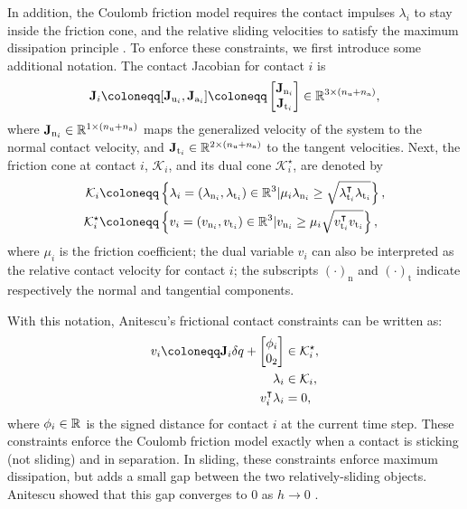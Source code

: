 In addition, the Coulomb friction model requires the contact impulses $\lambda_i$ to stay inside the friction cone, and the relative sliding velocities to satisfy the maximum dissipation principle \cite{stewart2000rigid}. To enforce these constraints, we first introduce some additional notation. The contact Jacobian for contact $i$ is 
\begin{equation}
\label{eq:contact_jacobian_i}
\J_i \coloneqq [\Ju[i], \Ja[i]] \coloneqq 
\begin{bmatrix}
\Jn[i] \\
\Jt[i]
\end{bmatrix}
\in \R[3 \times (\nU + \nA)],
\end{equation}
where $\Jn[i] \in \R[1 \times (\nU + \nA)]$ maps the generalized velocity of the system to the normal contact velocity, and $\Jt[i] \in \R[2 \times (\nU + \nA)]$ to the tangent velocities. Next, the friction cone at contact $i$, $\mathcal{K}_i$, and its dual cone $\mathcal{K}_i^\star$, are denoted by
\begin{subequations}
\label{eq:contact_cones}
\begin{align}
\mathcal{K}_i &\coloneqq \left\{\lambda_i = (\lambda_{\mathrm{n}_i}, \lambda_{\mathrm{t}_i}) \in \R[3] | \mu_i \lambda_{\mathrm{n}_i} \geq \sqrt{\lambda_{\mathrm{t}_i}^\intercal \lambda_{\mathrm{t}_i}} \right\}, \label{eq:contact_cones:lambda}\\
\mathcal{K}_i^\star &\coloneqq \left\{v_i = (v_{\mathrm{n}_i}, v_{\mathrm{t}_i}) \in \R[3] | v_{\mathrm{n}_i} \geq \mu_i \sqrt{v_{\mathrm{t}_i}^\intercal v_{\mathrm{t}_i}} \right\}, \label{eq:contact_cones:v}
\end{align}
\end{subequations}
where $\mu_i$ is the friction coefficient; the dual variable $v_i$ can also be interpreted as the relative contact velocity for contact $i$; the subscripts $(\cdot)_\mathrm{n}$ and $(\cdot)_\mathrm{t}$ indicate respectively the normal and tangential components. 

With this notation, Anitescu's frictional contact constraints can be written as:
\begin{subequations}
\label{eq:friction_constraints}
\begin{align}
v_i \coloneqq 
\J_i
{\delta q}
+
\begin{bmatrix}
\phi_i \\
0_2
\end{bmatrix}
&\in \mathcal{K}_i^\star, \label{eq:friction_constraints:v_i}\\
\lambda_i &\in \mathcal{K}_i, \\
v_i^\intercal \lambda_i &= 0, \label{eq:friction_constraints:complementary_slackness}
\end{align}
\end{subequations}
where $\phi_i \in \R$ is the signed distance for contact $i$ at the current time step. These constraints enforce the Coulomb friction model exactly when a contact is sticking (not sliding) and in separation. In sliding, these constraints enforce maximum dissipation, but adds a small gap between the two relatively-sliding objects. Anitescu showed that this gap converges to 0 as $h \rightarrow 0$ \cite{anitescu2006optimization}.

